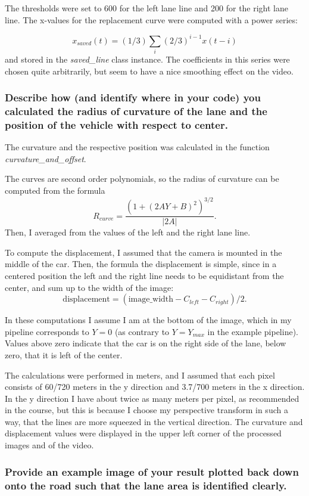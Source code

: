 \documentclass[a4paper,10pt]{article}
\begin{document}
The thresholds were set to 600 for the left lane line and 200 for the right lane line.
The x-values for the replacement curve were computed with a power series:

$$
x_{saved}(t) = (1/3) \sum_{i} (2/3)^{i-1}x(t-i) 
$$
%
and stored in the \emph{saved\_line} class instance.
The coefficients in this series were chosen quite arbitrarily, but seem to have a nice smoothing effect on the video.


\subsubsection{Describe how (and identify where in your code) you calculated the radius of curvature of the lane and the position of the vehicle with respect to center.}

The curvature and the respective position was calculated in the function \emph{curvature\_and\_offset}.

The curves are second order polynomials, so the radius of curvature can be computed from the formula 
%
$$
  R_{curve} = \frac{(1+(2AY+B)^2)^{3/2}}{|2A|}.
$$
%
Then, I averaged from the values of the left and the right lane line.


To compute the displacement, I assumed that the camera is mounted in the middle of the car.
Then, the formula the displacement is simple, since in a centered position the left and the right line needs to be equidistant from the center,
and sum up to the width of the image:
%
$$
 \text{displacement} = (\text{image\_width} - C_{left} - C_{right})/2.
$$

In these computations I assume I am at the bottom of the image, which in my pipeline corresponds to $Y=0$
(as contrary to $Y=Y_{max}$ in the example pipeline).
Values above zero indicate that the car is on the right side of the lane, below zero, that it is left of the center.

The calculations were performed in meters, and I assumed that each pixel consists of 60/720 meters in the y direction and 3.7/700 meters in the x direction.
In the y direction I have about twice as many meters per pixel, as recommended in the course, but this is because I choose my perspective transform
in such a way, that the lines are more squeezed in the vertical direction.
The curvature and displacement values were displayed in the upper left corner of the processed images and of the video.



\subsubsection{ Provide an example image of your result plotted back down onto the road such that the lane area is identified clearly.}
\end{document}
